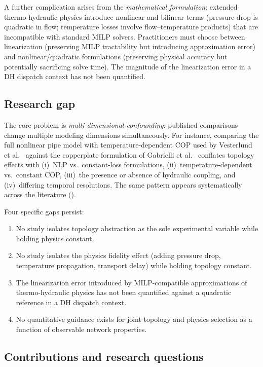 \documentclass[review,3p]{elsarticle}
\begin{document}
A further complication arises from the \emph{mathematical
formulation}: extended thermo-hydraulic physics introduce nonlinear
and bilinear terms (pressure drop is quadratic in flow;
temperature losses involve flow--temperature products) that are
incompatible with standard MILP solvers. Practitioners must choose
between linearization (preserving MILP tractability but introducing
approximation error) and nonlinear/quadratic formulations
(preserving physical accuracy but potentially sacrificing solve
time). The magnitude of the linearization error in a DH dispatch
context has not been quantified.

\subsection{Research gap}
\label{sec:gap}

The core problem is \emph{multi-dimensional confounding}: published
comparisons change multiple modeling dimensions simultaneously. For
instance, comparing the full nonlinear pipe model with
temperature-dependent COP used by Vesterlund et
al.~\cite{Vesterlund2017} against the copperplate formulation of
Gabrielli et al.~\cite{Gabrielli2018} conflates topology effects
with (i)~NLP vs.\ constant-loss formulations,
(ii)~temperature-dependent vs.\ constant COP,
(iii)~the presence or absence of hydraulic coupling, and
(iv)~differing temporal resolutions. The same pattern appears
systematically across the literature ().

Four specific gaps persist:
%
\begin{enumerate}[nosep]
  \item No study isolates topology abstraction as the sole
        experimental variable while holding physics constant.
  \item No study isolates the physics fidelity effect (adding
        pressure drop, temperature propagation, transport delay)
        while holding topology constant.
  \item The linearization error introduced by MILP-compatible
        approximations of thermo-hydraulic physics has not been
        quantified against a quadratic reference in a DH dispatch
        context.
  \item No quantitative guidance exists for joint topology and
        physics selection as a function of observable network
        properties.
\end{enumerate}

\subsection{Contributions and research questions}
\label{sec:contributions}
\end{document}
